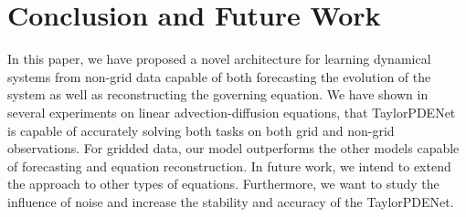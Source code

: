 \documentclass[runningheads]{llncs}
\begin{document}
\section{Conclusion and Future Work}
In this paper, we have proposed a novel architecture for learning dynamical systems from non-grid data capable of both forecasting the evolution of the system as well as reconstructing the governing equation.
We have shown in several experiments on linear advection-diffusion equations, that TaylorPDENet is capable of accurately solving both tasks on both grid and non-grid observations.
For gridded data, our model outperforms the other models capable of forecasting and equation reconstruction.
In future work, we intend to extend the approach to other types of equations.
Furthermore, we want to study the influence of noise and increase the stability and accuracy of the TaylorPDENet.
%
%
%
\clearpage


%
\end{document}
